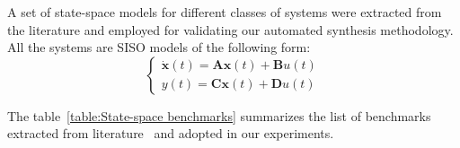 \documentclass[runningheads,a4paper]{llncs}
\begin{document}
A set of state-space models for different classes of systems were extracted from the literature and employed for validating our automated synthesis methodology. All the systems are SISO models of the following form:
\begin{equation}
\left\lbrace\begin{array}{c}
\dot{\textbf{x}}(t)=\textbf{A}\textbf{x}(t)+\textbf{B}u(t)\\
y(t)=\textbf{C}\textbf{x}(t)+\textbf{D}u(t)
\end{array}\right.
\end{equation}

The table~\ref{table:State-space benchmarks} summarizes the list of benchmarks extracted from literature~\cite{Franklin15,converters,maglev,CTMS} and adopted in our experiments.

%
\end{document}
